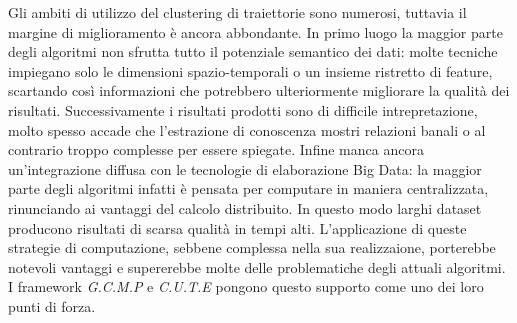 Gli ambiti di utilizzo del clustering di traiettorie sono numerosi, tuttavia il margine di miglioramento
è ancora abbondante.
In primo luogo la maggior parte degli algoritmi non sfrutta tutto il potenziale semantico dei dati:
molte tecniche impiegano solo le dimensioni spazio-temporali o un insieme ristretto di feature,
scartando così informazioni che potrebbero ulteriormente migliorare la qualità dei risultati.
Successivamente i risultati prodotti sono di difficile intrepretazione, molto spesso accade che
l'estrazione di conoscenza mostri relazioni banali o al contrario troppo complesse per essere spiegate.
Infine manca ancora un'integrazione diffusa con le tecnologie di elaborazione Big Data:
la maggior parte degli algoritmi infatti è pensata per computare in maniera centralizzata, rinunciando
ai vantaggi del calcolo distribuito. In questo modo larghi dataset producono risultati di scarsa
qualità in tempi alti.
L'applicazione di queste strategie di computazione, sebbene complessa nella sua realizzaione, porterebbe
notevoli vantaggi e supererebbe molte delle problematiche degli attuali algoritmi.
I framework \textit{G.C.M.P}\cite{DBLP:journals/pvldb/FanZWT16} e \textit{C.U.T.E} pongono questo
supporto come uno dei loro punti di forza.


